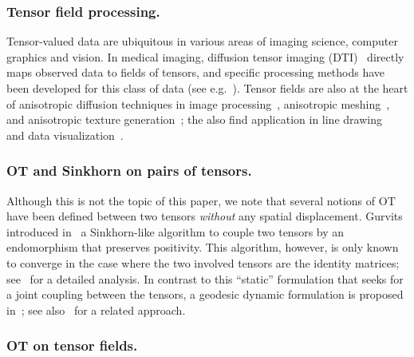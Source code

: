 \subsubsection{Tensor field processing.}

Tensor-valued data are ubiquitous in various areas of imaging science, computer graphics and vision. In medical imaging, diffusion tensor imaging (DTI)~\cite{wandell2016clarifying} directly maps observed data to fields of tensors, and specific processing methods have been developed for this class of data (see e.g.~\cite{Dryden2009,Deriche2006}). Tensor fields are also at the heart of anisotropic diffusion techniques in image processing~\cite{weickert1998anisotropic}, anisotropic meshing~\cite{alliez2003anisotropic,demaret2006image,peyre-iccv-09}, and anisotropic texture generation~\cite{LagaImproving}; the also find application in line drawing~\cite{VaxmanCDPBHB16} and data visualization~\cite{HotzFHHJJ04}. 

\subsubsection{OT and Sinkhorn on pairs of tensors.}

Although this is not the topic of this paper, we note that several %
notions of OT have been defined between two tensors \emph{without} any spatial displacement. Gurvits introduced in~\cite{gurvits2004classical} a Sinkhorn-like algorithm to couple two tensors by an endomorphism that preserves positivity. This algorithm, however, is only known to converge in the case where the two involved tensors are the identity matrices;  see~\cite{georgiou2015positive} for a detailed analysis. 
%
In contrast to this ``static'' formulation that seeks for a joint coupling between the tensors, a geodesic dynamic formulation is proposed in~\cite{Carlen2014}; see also~\cite{Chen2016,ChenGangbo17} for a related approach.



\subsubsection{OT on tensor fields.}


